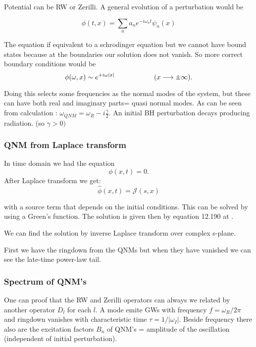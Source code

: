 \documentclass[12 pt]{article}
\begin{document}
	Potential can be RW or Zerilli. A general evolution of a perturbation would be 
	
	\begin{equation}
		\phi(t,x) = \sum_n a_n e^{-i\omega_n t } \psi_n(x) 
	\end{equation}
	
	The equation if equivalent to a schrodinger equation but we cannot have bound states because at the boundaries our solution does not vanish. So more correct boundary conditions would be 
	\begin{equation}
		\phi(\omega,x) \sim e^{+i \omega |x|} \hspace{20mm} (x \longrightarrow \pm \infty).
	\end{equation}
	
	Doing this selects some frequencies as the normal modes of the system, but these can have both real and imaginary parts= quasi normal modes. As can be seen from calculation : $\omega_{QNM} = \omega_R - i \frac{\gamma}{2}$.
	An initial BH perturbation decays producing radiation. (so $\gamma > 0)$
	
	\subsubsection{QNM from Laplace transform}
	
	In time domain we had the equation 
	\begin{equation}
		[\partial_x^2 - \partial_t^2 - V(x)]\phi(x,t) = 0.
	\end{equation}
	After Laplace transform we get:
	\begin{equation}
		[\partial_x^2 - s^2 - V(x)]\hat{\phi}(x,t) = \mathcal{J}(s,x)
	\end{equation}
	
	with a source term that depends on the initial conditions. This can be solved by using a Green's function. The solution is given then by equation 12.190 at \cite{maggiore}.
	
	We can find the solution by inverse Laplace transform over complex s-plane. 
	
	First we have the ringdown from the QNMs but when they have vanished we can see the late-time power-law tail. 
	
	\subsubsection{Spectrum of QNM's}
	
	One can proof that the RW and Zerilli operators can always we related by another operator $D_l$ for each $l$.
	A mode emite GWs with frequency $f = \omega_R /2\pi$  and ringdown vanishes with characteristic time $\tau = 1/|\omega_I|$. Beside frequency there also are the excitation factors $B_n$ of QNM's = amplitude of the oscillation (independent of initial perturbation). 
	
\end{document}

